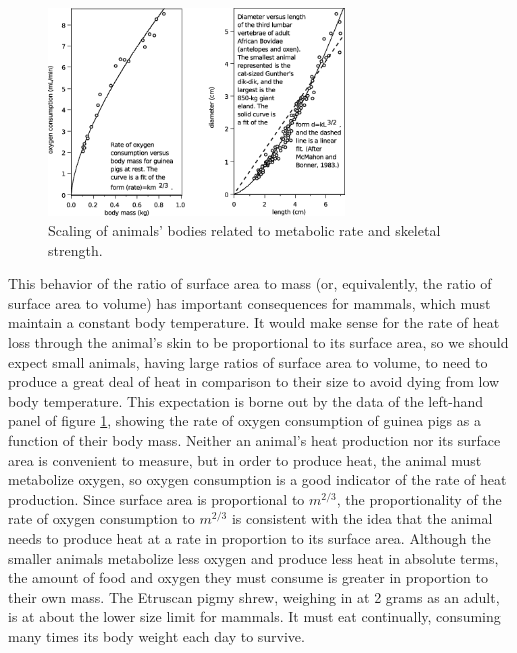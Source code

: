\begin{figure}
\begin{center}
\includegraphics[width=0.7\textwidth]{./scaling/figs/scaling-animals-2}
\caption{ \qquad Scaling of animals' bodies related to metabolic rate and skeletal strength.}
\label{scaling-animals-2}
\end{center}
\end{figure}


This behavior of the ratio of surface area to mass (or,
equivalently, the ratio of surface area to volume) has
important consequences for mammals, which must maintain a
constant body temperature. It would make sense for the rate
of heat loss through the animal's skin to be proportional to
its surface area, so we should expect small animals, having
large ratios of surface area to volume, to need to produce a
great deal of heat in comparison to their size to avoid
dying from low body temperature. This expectation is borne
out by the data of the left-hand panel of
figure \ref{scaling-animals-2}, showing the rate of
oxygen consumption of guinea pigs as a function of their
body mass. Neither an animal's heat production nor its
surface area is convenient to measure, but in order to
produce heat, the animal must metabolize oxygen, so oxygen
consumption is a good indicator of the rate of heat
production. Since surface area is proportional to $m^{2/3}$, the
proportionality of the rate of oxygen consumption to $m^{2/3}$ is
consistent with the idea that the animal needs to produce
heat at a rate in proportion to its surface area. Although
the smaller animals metabolize less oxygen and produce less
heat in absolute terms, the amount of food and oxygen they
must consume is greater in proportion to their own mass. The
Etruscan pigmy shrew, weighing in at 2 grams as an adult, is
at about the lower size limit for mammals. It must eat
continually, consuming many times its body weight each day to survive.

